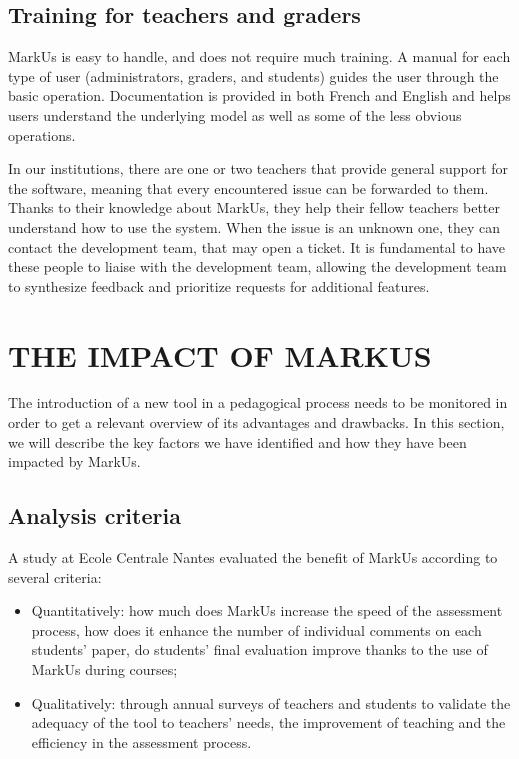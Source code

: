 \documentclass[twocolumn,10pt]{asme2e}
\begin{document}
\subsection*{Training for teachers and graders}

MarkUs is easy to handle, and does not require much training. A manual for each type of user (administrators, graders, and students) guides the user through the basic operation. Documentation is provided in both French and English and helps users understand the underlying model as well as some of the less obvious operations.

In our institutions, there are one or two teachers that provide general support for the software, meaning that every encountered issue can be forwarded to them. Thanks to their knowledge about MarkUs, they help their fellow teachers better understand how to use the system. When the issue is an unknown one, they can contact the development team, that may open a ticket. It is fundamental to have these people to liaise with the development team, allowing the development team to synthesize feedback and prioritize requests for additional features. 

\section*{THE IMPACT OF MARKUS}

The introduction of a new tool in a pedagogical process needs to be monitored in order to get a relevant overview of its advantages and drawbacks. In this section, we will describe the key factors we have identified and how they have been impacted by MarkUs. 


\subsection*{Analysis criteria}
A study at Ecole Centrale Nantes evaluated the benefit of MarkUs according to several criteria: 
\begin{itemize}
\item Quantitatively: how much does MarkUs increase the speed of the assessment process, how does it enhance the number of individual comments on each students' paper, do students' final evaluation improve thanks to the use of MarkUs during courses;
\item Qualitatively: through annual surveys of teachers and students to validate the adequacy of the tool to teachers' needs, the improvement of teaching and the efficiency in the assessment process.
\end{itemize}
\end{document}
